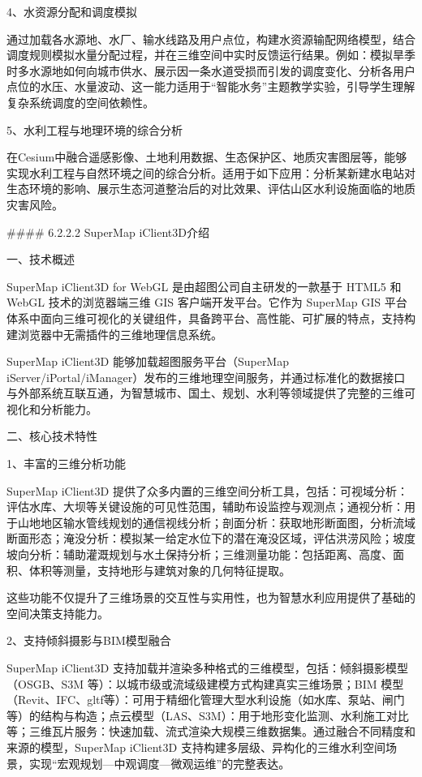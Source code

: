 4、水资源分配和调度模拟

通过加载各水源地、水厂、输水线路及用户点位，构建水资源输配网络模型，结合调度规则模拟水量分配过程，并在三维空间中实时反馈运行结果。例如：模拟旱季时多水源地如何向城市供水、展示因一条水道受损而引发的调度变化、分析各用户点位的水压、水量波动、这一能力适用于``智能水务''主题教学实验，引导学生理解复杂系统调度的空间依赖性。

5、水利工程与地理环境的综合分析

在Cesium中融合遥感影像、土地利用数据、生态保护区、地质灾害图层等，能够实现水利工程与自然环境之间的综合分析。适用于如下应用：分析某新建水电站对生态环境的影响、展示生态河道整治后的对比效果、评估山区水利设施面临的地质灾害风险。

\#\#\#\# 6.2.2.2 SuperMap iClient3D介绍

一、技术概述

SuperMap iClient3D for WebGL 是由超图公司自主研发的一款基于 HTML5 和 WebGL 技术的浏览器端三维 GIS 客户端开发平台。它作为 SuperMap GIS 平台体系中面向三维可视化的关键组件，具备跨平台、高性能、可扩展的特点，支持构建浏览器中无需插件的三维地理信息系统。

SuperMap iClient3D 能够加载超图服务平台（SuperMap iServer/iPortal/iManager）发布的三维地理空间服务，并通过标准化的数据接口与外部系统互联互通，为智慧城市、国土、规划、水利等领域提供了完整的三维可视化和分析能力。

二、核心技术特性

1、丰富的三维分析功能

SuperMap iClient3D 提供了众多内置的三维空间分析工具，包括：可视域分析：评估水库、大坝等关键设施的可见性范围，辅助布设监控与观测点；通视分析：用于山地地区输水管线规划的通信视线分析；剖面分析：获取地形断面图，分析流域断面形态；淹没分析：模拟某一给定水位下的潜在淹没区域，评估洪涝风险；坡度坡向分析：辅助灌溉规划与水土保持分析；三维测量功能：包括距离、高度、面积、体积等测量，支持地形与建筑对象的几何特征提取。

这些功能不仅提升了三维场景的交互性与实用性，也为智慧水利应用提供了基础的空间决策支持能力。

2、支持倾斜摄影与BIM模型融合

SuperMap iClient3D 支持加载并渲染多种格式的三维模型，包括：倾斜摄影模型（OSGB、S3M 等）：以城市级或流域级建模方式构建真实三维场景；BIM 模型（Revit、IFC、gltf等）：可用于精细化管理大型水利设施（如水库、泵站、闸门等）的结构与构造；点云模型（LAS、S3M）：用于地形变化监测、水利施工对比等；三维瓦片服务：快速加载、流式渲染大规模三维数据集。通过融合不同精度和来源的模型，SuperMap iClient3D 支持构建多层级、异构化的三维水利空间场景，实现``宏观规划---中观调度---微观运维''的完整表达。

